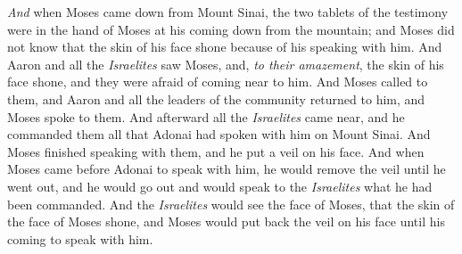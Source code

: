 \begin{biblechapter}
\verse \textit{And} when Moses came down from Mount Sinai, the two tablets of the testimony were in the hand of Moses at his coming down from the mountain; and Moses did not know that the skin of his face shone because of his speaking with him.
\verse And Aaron and all the \textit{Israelites} saw Moses, and, \textit{to their amazement}, the skin of his face shone, and they were afraid of coming near to him.
\verse And Moses called to them, and Aaron and all the leaders of the community returned to him, and Moses spoke to them.
\verse And afterward all the \textit{Israelites} came near, and he commanded them all that Adonai had spoken with him on Mount Sinai.
\verse And Moses finished speaking with them, and he put a veil on his face.
\verse And when Moses came before Adonai to speak with him, he would remove the veil until he went out, and he would go out and would speak to the \textit{Israelites} what he had been commanded.
\verse And the \textit{Israelites} would see the face of Moses, that the skin of the face of Moses shone, and Moses would put back the veil on his face until his coming to speak with him.
\end{biblechapter}

